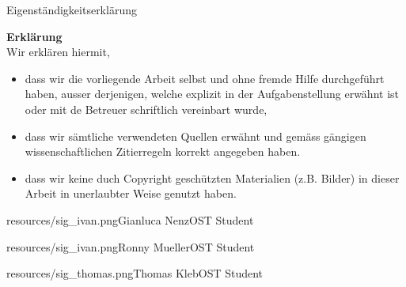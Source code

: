 Eigenständigkeitserklärung

\vspace{2 cm}

\noindent \textbf{Erklärung} \\
Wir erklären hiermit, \\

\begin{itemize}
    \item dass wir die vorliegende Arbeit selbst und ohne fremde Hilfe durchgeführt haben, ausser derjenigen, welche explizit in der Aufgabenstellung erwähnt ist oder mit de Betreuer schriftlich vereinbart wurde,
    \item dass wir sämtliche verwendeten Quellen erwähnt und gemäss gängigen wissen\-schaftlichen Zitierregeln korrekt angegeben haben.
    \item dass wir keine duch Copyright geschützten Materialien (z.B. Bilder) in dieser Arbeit in unerlaubter Weise genutzt haben.
\end{itemize}

\signature{0.75}{resources/sig_ivan.png}{Gianluca Nenz}{OST Student}\hfill\signature{0.75}{resources/sig_ivan.png}{Ronny Mueller}{OST Student}

\signature{0.2}{resources/sig_thomas.png}{Thomas Kleb}{OST Student}

